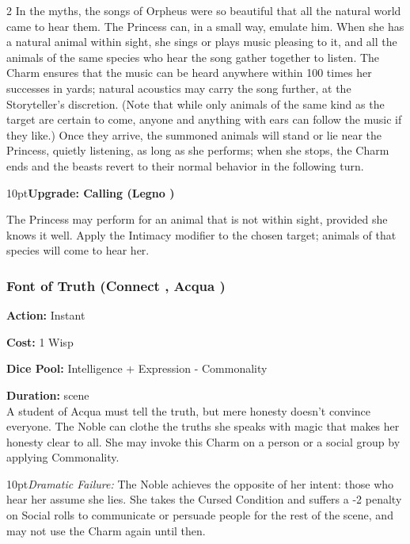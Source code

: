 \begin{multicols}{2}
In the myths, the songs of Orpheus were so beautiful that all the natural world came to hear them. The Princess can, in a small way, emulate him. When she has a natural animal within sight, she sings or plays music pleasing to it, and all the animals of the same species who hear the song gather together to listen. The Charm ensures that the music can be heard anywhere within 100 times her successes in yards; natural acoustics may carry the song further, at the Storyteller's discretion. (Note that while only animals of the same kind as the target are certain to come, anyone and anything with ears can follow the music if they like.) Once they arrive, the summoned animals will stand or lie near the Princess, quietly listening, as long as she performs; when she stops, the Charm ends and the beasts revert to their normal behavior in the following turn.

\begin{myindentpar}{10pt}\textbf{Upgrade: Calling (Legno  \textbullet\textbullet\textbullet)}

The Princess may perform for an animal that is not within sight, provided she knows it well. Apply the Intimacy modifier to the chosen target; animals of that species will come to hear her.\end{myindentpar}

\subsubsection*{Font of Truth (Connect \textbullet\textbullet\textbullet, Acqua \textbullet\textbullet)}

\noindent \textbf{Action:} Instant

\noindent \textbf{Cost:} 1 Wisp

\noindent \textbf{Dice Pool:} Intelligence + Expression - Commonality

\noindent \textbf{Duration:} scene \\

\noindent  A student of Acqua must tell the truth, but mere honesty doesn't convince everyone. The Noble can clothe the truths she speaks with magic that makes her honesty clear to all. She may invoke this Charm on a person or a social group by applying Commonality. 

\begin{myindentpar}{10pt}\emph{Dramatic Failure:} The Noble achieves the opposite of her intent: those who hear her assume she lies. She takes the Cursed Condition and suffers a -2 penalty on Social rolls to communicate or persuade people for the rest of the scene, and may not use the Charm again until then.
    

\end{myindentpar}
\end{multicols}
